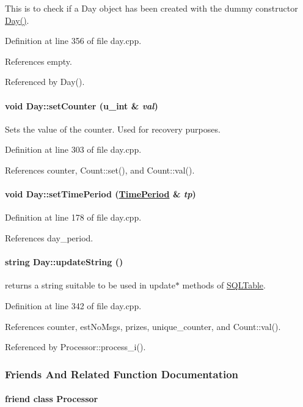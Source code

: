 This is to check if a Day object has been created with the dummy constructor \hyperlink{classDay_Daya2}{Day()}. 

Definition at line 356 of file day.cpp.

References empty.

Referenced by Day().\hypertarget{classDay_Daya9}{
\paragraph[setCounter]{\setlength{\rightskip}{0pt plus 5cm}void Day::set\-Counter (u\_\-int \& {\em val})}\hfill}
\label{classDay_Daya9}


Sets the value of the counter. Used for recovery purposes. 

Definition at line 303 of file day.cpp.

References counter, Count::set(), and Count::val().\hypertarget{classDay_Daya4}{
\paragraph[setTimePeriod]{\setlength{\rightskip}{0pt plus 5cm}void Day::set\-Time\-Period (\hyperlink{classTimePeriod}{Time\-Period} \& {\em tp})}\hfill}
\label{classDay_Daya4}




Definition at line 178 of file day.cpp.

References day\_\-period.\hypertarget{classDay_Daya14}{
\paragraph[updateString]{\setlength{\rightskip}{0pt plus 5cm}string Day::update\-String ()}\hfill}
\label{classDay_Daya14}


returns a string suitable to be used in update$\ast$ methods of \hyperlink{classSQLTable}{SQLTable}. 

Definition at line 342 of file day.cpp.

References counter, est\-No\-Msgs, prizes, unique\_\-counter, and Count::val().

Referenced by Processor::process\_\-i().

\subsubsection{Friends And Related Function Documentation}
\hypertarget{classDay_Dayl0}{
\paragraph[Processor]{\setlength{\rightskip}{0pt plus 5cm}friend class Processor}\hfill}
\label{classDay_Dayl0}




